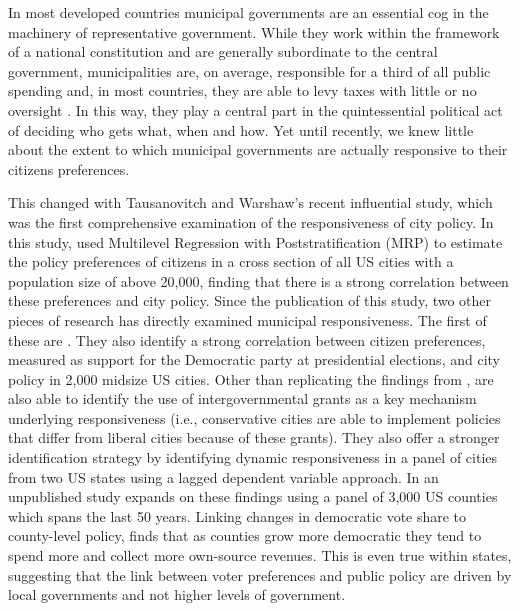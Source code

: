 \documentclass[a4paper,12pt]{article}
\begin{document}
In most developed countries municipal governments are an essential cog in the machinery of representative government. While they work within the framework of a national constitution and are generally subordinate to the central government, municipalities are, on average, responsible for a third of all public spending and, in most countries, they are able to levy taxes with little or no oversight \cite{oecd2016subnational}. In this way, they play a central part in the quintessential political act of deciding who gets what, when and how.  Yet until recently, we knew little about the extent to which municipal governments are actually responsive to their citizens preferences.


This changed with Tausanovitch and Warshaw's \citeyear{tausanovitch2014representation} recent influential study, which  was the first comprehensive examination of the responsiveness of city policy. In this study, \citeauthor{tausanovitch2014representation} used Multilevel Regression with Poststratification (MRP) to estimate the policy preferences of citizens in a cross section of all US cities with a population size of above 20,000, finding that there is a strong correlation between these preferences and city policy. Since the publication of this study, two other pieces of research has directly examined municipal responsiveness. The first of these are \cite{einstein2016pushing}. They also identify a strong correlation between citizen preferences, measured as support for the Democratic party at presidential elections,  and city policy in 2,000 midsize US cities. Other than replicating the findings from \citeauthor{tausanovitch2014representation}, \citeauthor{einstein2016pushing} are also able to identify the use of intergovernmental grants as a key mechanism underlying responsiveness (i.e., conservative cities are able to implement policies that differ from liberal cities because of these grants). They also offer a stronger identification strategy by identifying dynamic responsiveness \citep[cf.][]{stimson1995dynamic} in a panel of cities from two US states using a lagged dependent variable approach. In an unpublished study \cite{sances2017voters} expands on these findings using a panel of 3,000 US counties which spans the last 50 years. Linking changes in democratic vote share to county-level policy, \citeauthor{sances2017voters} finds that as counties grow more democratic they tend to spend more and collect more own-source revenues. This is even true within states, suggesting that the link between voter preferences and public policy are driven by local governments and not higher levels of government.
\end{document}
